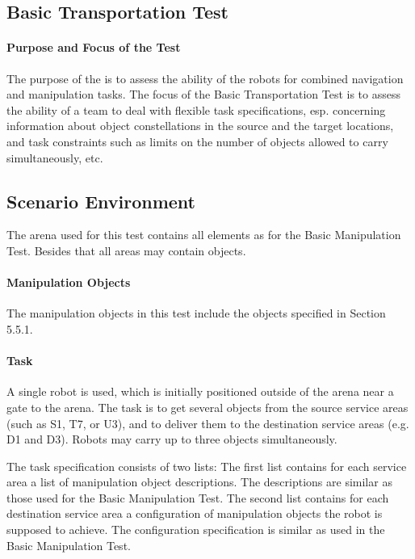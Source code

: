 \subsection{Basic Transportation Test}

\paragraph{Purpose and Focus of the Test}
The purpose of the  is to assess the ability of the robots for combined navigation and manipulation tasks. 
The focus of the Basic Transportation Test is to assess the ability of a team to deal with flexible task specifications, esp. concerning information about object constellations in the source and the target locations, and task constraints such as limits on the number of objects allowed to carry simultaneously, etc.  

\subsection{Scenario Environment}
The arena used for this test contains all elements as for the Basic Manipulation Test. Besides that all areas may contain objects.

\paragraph{Manipulation Objects}
The manipulation objects in this test include the objects specified in Section 5.5.1.

\paragraph{Task}
A single robot is used, which is initially positioned outside of the arena near a gate to the arena. The task is to get several objects from the source service areas (such as S1, T7, or U3), and to deliver them to the destination service areas (e.g. D1 and D3). Robots may carry up to three objects simultaneously. 
\par
The task specification consists of two lists:
The first list contains for each service area a list of manipulation object descriptions. The descriptions are similar as those used for the Basic Manipulation Test. 
The second list contains for each destination service area a configuration of manipulation objects the robot is supposed to achieve. The configuration specification is similar as used in the Basic Manipulation Test. 

